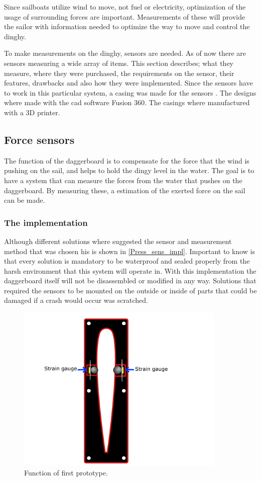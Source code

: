
Since sailboats utilize wind to move, not fuel or electricity, optimization of the usage of surrounding forces are important. Measurements of these will provide the sailor with information needed to optimize the way to move and control the dinghy.

To make measurements on the dinghy, sensors are needed. As of now there are sensors measuring a wide array of items. This section describes; what they measure, where they were purchased, the requirements on the sensor, their features, drawbacks and also how they were implemented.
Since the sensors have to work in this particular system, a casing was made for the sensors .
The designs where made with the \gls{cad} software Fusion 360\cite{cad}. The casings where manufactured with a 3D printer.

\subsection{Force sensors}
The function of the daggerboard is to compensate for the force that the wind is pushing on the sail, and helps to hold the dingy level in the water. The goal is to have a system that can measure the forces from the water that pushes on the daggerboard. By measuring these, a estimation of the exerted force on the sail can be made. 


\subsubsection{The implementation}
Although different solutions where suggested the sensor and measurement method that was chosen his is shown in \autoref{Press_sens_impl}. 
Important to know is that every solution is mandatory to be waterproof and sealed properly from the harsh environment that this system will operate in. 
With this implementation the daggerboard itself will not be disassembled or modified in any way. 
Solutions that required the sensors to be mounted on the outside or inside of parts that could be damaged if a crash would occur was scratched.

\begin{figure}[H]
\begin{center}
	\includegraphics[width = 10cm]{Figures/Prototyp_1.png}
	\caption{Function of first prototype.}
	\label{Press_sens_impl}
\end{center}
\end{figure}



